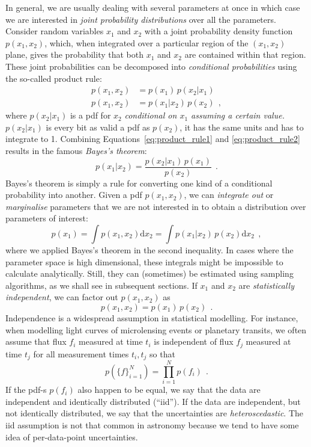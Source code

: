 \documentclass[12pt,dvipsnames]{report}
\newcommand{\hquad}{~~}
\begin{document}
In general, we are usually dealing with several parameters at once in which
case we are interested in \emph{joint probability distributions} over all the
parameters. Consider random variables $x_1$ and $x_2$ with a joint probability
density function $p(x_1,x_2)$, which, when integrated over a particular region of the 
$(x_1, x_2)$ plane,
gives the probability that both $x_1$ and $x_2$ are contained within that
region. These joint probabilities can be decomposed into \emph{conditional
    probabilities} using the so-called product rule:
\begin{align}
    p(x_1,x_2) & =p(x_1)\,p(x_2\lvert x_1) 
    \label{eq:product_rule1}
    \\
    p(x_1,x_2) & =p(x_1\lvert x_2)\,p(x_2)
    \hquad,
    \label{eq:product_rule2}
\end{align}
where $p(x_2\lvert x_1)$ is a pdf for $x_2$ \emph{conditional on
    $x_1$ assuming a certain value.} $p(x_2\lvert x_1)$ is every bit as
valid a pdf as $p(x_2)$, it has the same units and has to integrate to 1.
Combining Equations~\ref{eq:product_rule1} and \ref{eq:product_rule2} results in the famous \emph{Bayes's theorem}:
\begin{equation}
    p(x_1\lvert x_2)= \frac{p(x_2\lvert x_1)\,p(x_1)}{p(x_2)}
    \hquad.
    \label{eq:bayes_theorem}
\end{equation}
Bayes's theorem is simply a rule for converting one kind of a conditional probability
into another.
Given a pdf $p(x_1,x_2)$, we can \emph{integrate out} or
\emph{marginalise} parameters that we are not interested in to obtain a distribution over
parameters of interest:
\begin{equation}
    p(x_1)=\int p(x_1,x_2)\textrm{d}x_2=\int p(x_1\lvert
    x_2)\,p(x_2)\textrm{d}x_2
    \hquad,
    \label{eq:marginalisation}
\end{equation}
where we applied Bayes's theorem in the second inequality.
In cases where the parameter space is high dimensional, these integrals might be
impossible to calculate analytically. Still, they can (sometimes) be estimated using sampling
algorithms, as we shall see in subsequent sections.
If $x_1$ and $x_2$ are \emph{statistically independent}, we can factor out $p(x_1,x_2)$ as
\begin{equation}
    p(x_1,x_2)=p(x_1)\,p(x_2)
    \hquad.
\end{equation}
Independence is a widespread assumption in statistical modelling. For instance, when modelling light curves
of microlensing events or planetary transits, we often assume that flux $f_i$ measured at time $t_i$ is independent
of flux $f_j$ measured at time $t_j$  for all measurement times $t_i,t_j$ so that
\begin{equation}
    p(\{f\}_{i=1}^N)=\prod_{i=1}^Np(f_i)
    \hquad.
    \label{eq:likelihood_indep}
\end{equation}
If the pdf-s $p(f_i)$ also happen to be equal, we say that the data are independent and
identically distributed (``iid''). If the data are independent, but not identically distributed,
we say that the uncertainties are \emph{heteroscedastic}.
The iid assumption is not that common in astronomy because we tend to have some idea of 
per-data-point uncertainties.
\end{document}
